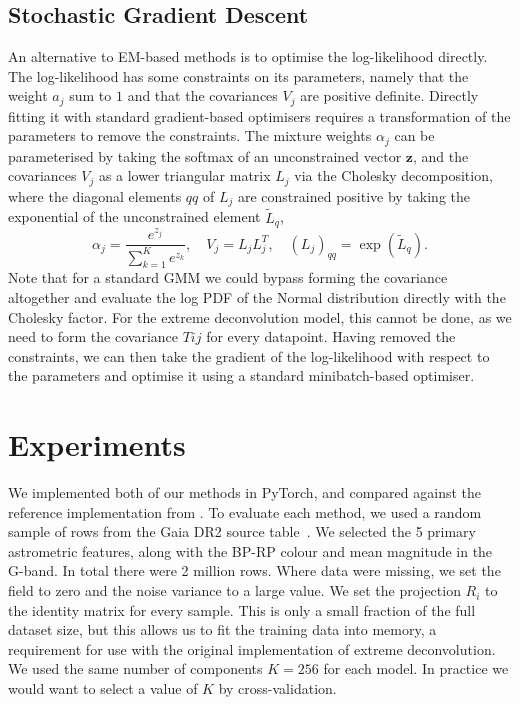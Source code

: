 \documentclass{article}
\begin{document}
\subsection{Stochastic Gradient Descent}

An alternative to EM-based methods is to optimise the log-likelihood directly.
The log-likelihood has some constraints on its parameters, namely that the weight $a_j$ sum to $1$ and that the covariances $V_j$ are positive definite.
Directly fitting it with standard gradient-based optimisers requires a transformation of the parameters to remove the constraints.
The mixture weights $\alpha_j$ can be parameterised by taking the softmax of an unconstrained vector $\mathbf{z}$, and the covariances $V_j$ as a lower triangular matrix $L_j$ via the Cholesky decomposition, where the diagonal elements $qq$ of $L_j$ are constrained positive by taking the exponential of the unconstrained element $\tilde{L}_q$,
\begin{equation}
\alpha_j = \frac{e^{z_j}}{\sum_{k=1}^K e^{z_k}}, \quad
V_j = L_jL_j^T, \quad
(L_j)_{qq} = \exp({\tilde{L}_q}).
\end{equation}
Note that for a standard GMM we could bypass forming the covariance altogether and evaluate the log PDF of the Normal distribution directly with the Cholesky factor.
For the extreme deconvolution model, this cannot be done, as we need to form the covariance $Tij$ for every datapoint.
Having removed the constraints, we can then take the gradient of the log-likelihood with respect to the parameters and optimise it using a standard minibatch-based optimiser.

\section{Experiments}

We implemented both of our methods in PyTorch, and compared against the reference implementation from \citet{bovyExtremeDeconvolutionInferring2011}.
To evaluate each method, we used a random sample of rows from the Gaia DR2 source table~\cite{brownGaiaDataRelease2018}.
We selected the 5 primary astrometric features, along with the BP-RP colour and mean magnitude in the G-band.
In total there were 2 million rows.
Where data were missing, we set the field to zero and the noise variance to a large value.
We set the projection $R_i$ to the identity matrix for every sample.
This is only a small fraction of the full dataset size, but this allows us to fit the training data into memory, a requirement for use with the original implementation of extreme deconvolution.
We used the same number of components $K=256$ for each model.
In practice we would want to select a value of $K$ by cross-validation.
\end{document}
